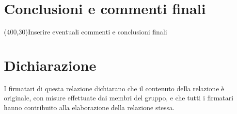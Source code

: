 \documentclass[10pt,a4paper]{article}
\begin{document}
\section{Conclusioni e commenti finali}
\framebox(400,30){Inserire eventuali commenti e conclusioni finali}

\section*{Dichiarazione}
I firmatari di questa relazione dichiarano che il contenuto della relazione \`e originale, con misure effettuate dai membri del gruppo, e che tutti i firmatari hanno contribuito alla elaborazione della relazione stessa.
\end{document}
